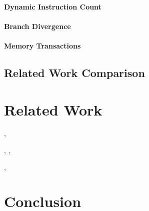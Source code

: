 \documentclass[conference, 10pt]{IEEEtran}
\begin{document}
\paragraph{Dynamic Instruction Count}

\paragraph{Branch Divergence}

\paragraph{Memory Transactions}

\subsection{Related Work Comparison}



\section{Related Work}
\label{sec:related-work}

\cite{ref:ptl-sim}, \cite{ref:simple-scalar}



\cite{ref:ramp}

\cite{ref:ocelot-pact}

\cite{ref:pdes}, \cite{ref:multi-threaded-sim},
\cite{ref:cuda-simulation-of-many-core}

\cite{ref:verilog-cuda}, \cite{ref:bluespec} 

\cite{ref:lynx}


\section{Conclusion}
\label{sec:conclusion}




\end{document}
